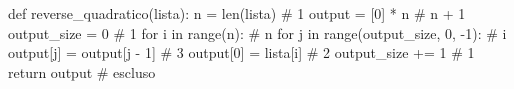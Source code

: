 \begin{unipdcode}[language=Python]
def reverse_quadratico(lista):
    n = len(lista)                               # 1
    output = [0] * n                             # n + 1
    output_size = 0                              # 1
    for i in range(n):                           # n
        for j in range(output_size, 0, -1):      # i
            output[j] = output[j - 1]            # 3
        output[0] = lista[i]                     # 2
        output_size += 1                         # 1
    return output                                # escluso
\end{unipdcode}
